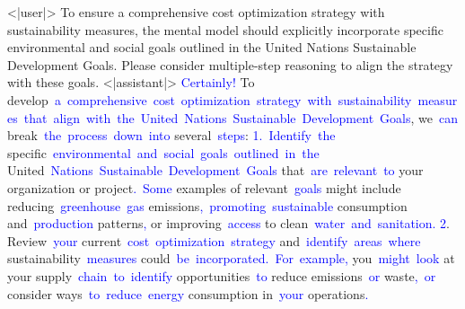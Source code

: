 \documentclass{article}
\begin{document}
\begin{tcolorbox}[colframe=black,colback=white]
<|user|>
To ensure a comprehensive cost optimization strategy with sustainability measures, the mental model should explicitly incorporate specific environmental and social goals outlined in the United Nations Sustainable Development Goals. Please consider multiple-step reasoning to align the strategy with these goals.
<|assistant|>
\textcolor{blue}{Certainly}\textcolor{blue}{!} To develop\textcolor{blue}{~a}\textcolor{blue}{~comprehensive}\textcolor{blue}{~cost}\textcolor{blue}{~optimization}\textcolor{blue}{~strategy}\textcolor{blue}{~with}\textcolor{blue}{~sustainability}\textcolor{blue}{~measures}\textcolor{blue}{~that}\textcolor{blue}{~align}\textcolor{blue}{~with}\textcolor{blue}{~the}\textcolor{blue}{~United}\textcolor{blue}{~Nations}\textcolor{blue}{~Sustainable}\textcolor{blue}{~Development}\textcolor{blue}{~Goals}, we\textcolor{blue}{~can} break\textcolor{blue}{~the}\textcolor{blue}{~process}\textcolor{blue}{~down}\textcolor{blue}{~into} several\textcolor{blue}{~steps}:
\textcolor{blue}{1}\textcolor{blue}{.}\textcolor{blue}{~Identify}\textcolor{blue}{~the} specific\textcolor{blue}{~environmental}\textcolor{blue}{~and}\textcolor{blue}{~social}\textcolor{blue}{~goals}\textcolor{blue}{~outlined}\textcolor{blue}{~in}\textcolor{blue}{~the} United\textcolor{blue}{~Nations}\textcolor{blue}{~Sustainable}\textcolor{blue}{~Development}\textcolor{blue}{~Goals} that\textcolor{blue}{~are}\textcolor{blue}{~relevant}\textcolor{blue}{~to} your organization or project\textcolor{blue}{.}\textcolor{blue}{~Some} examples of relevant\textcolor{blue}{~goals} might include reducing\textcolor{blue}{~greenhouse}\textcolor{blue}{~gas} emissions\textcolor{blue}{,}\textcolor{blue}{~promoting}\textcolor{blue}{~sustainable} consumption and\textcolor{blue}{~production} patterns\textcolor{blue}{,} or improving\textcolor{blue}{~access} to clean\textcolor{blue}{~water}\textcolor{blue}{~and}\textcolor{blue}{~sanitation}\textcolor{blue}{.
}\textcolor{blue}{2}. Review\textcolor{blue}{~your} current\textcolor{blue}{~cost}\textcolor{blue}{~optimization}\textcolor{blue}{~strategy} and\textcolor{blue}{~identify}\textcolor{blue}{~areas}\textcolor{blue}{~where} sustainability\textcolor{blue}{~measures} could\textcolor{blue}{~be}\textcolor{blue}{~incorporated}\textcolor{blue}{.}\textcolor{blue}{~For}\textcolor{blue}{~example}\textcolor{blue}{,} you\textcolor{blue}{~might}\textcolor{blue}{~look} at your supply\textcolor{blue}{~chain}\textcolor{blue}{~to}\textcolor{blue}{~identify} opportunities\textcolor{blue}{~to} reduce emissions\textcolor{blue}{~or} waste\textcolor{blue}{,}\textcolor{blue}{~or} consider ways\textcolor{blue}{~to}\textcolor{blue}{~reduce}\textcolor{blue}{~energy} consumption in\textcolor{blue}{~your} operations\textcolor{blue}{.
}
\end{tcolorbox}
\end{document}
